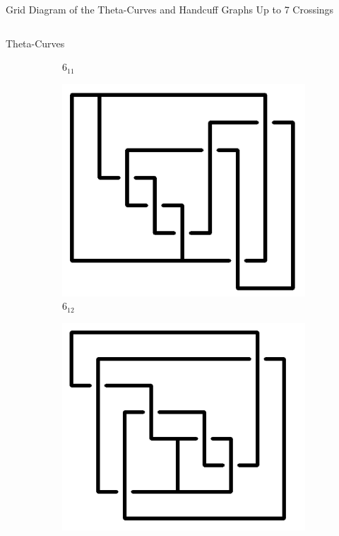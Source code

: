 \documentclass[final]{beamer}
\begin{document}
\begin{frame}[t]
\begin{alertblock}{Grid Diagram of the Theta-Curves and Handcuff Graphs Up to 7 Crossings}
\begin{columns}[t]
\begin{column}{0.5\textwidth}
\begin{alertblock}{Theta-Curves}
\begin{figure}
\begin{subfigure}{0.075\textwidth}
    \caption{$6_{11}$} 
    \end{subfigure}
    \begin{subfigure}{0.075\textwidth}
    \includegraphics[width=\columnwidth]{../Midterm_Poster/grid_diagram/theta_6_12.png}
    \caption{$6_{12}$} 
    \end{subfigure}
    \begin{subfigure}{0.075\textwidth}
    \includegraphics[width=\columnwidth]{../Midterm_Poster/grid_diagram/theta_6_13.png}

\end{subfigure}
\end{figure}
\end{alertblock}
\end{column}
\end{columns}
\end{alertblock}
\end{frame}
\end{document}
